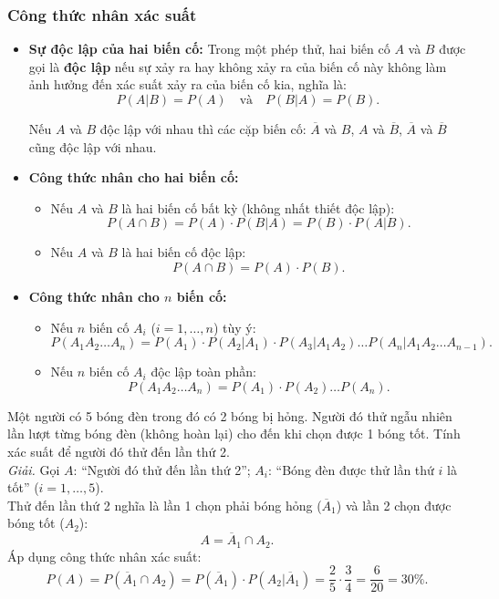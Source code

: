 \subsubsection{Công thức nhân xác suất}
\begin{itemize}[leftmargin=1.5em]
    \item \textbf{Sự độc lập của hai biến cố:}
    Trong một phép thử, hai biến cố $A$ và $B$ được gọi là \textbf{độc lập} nếu sự xảy ra hay không xảy ra của biến cố này không làm ảnh hưởng đến xác suất xảy ra của biến cố kia, nghĩa là:
    \[
    P(A|B) = P(A) \quad \text{và} \quad P(B|A) = P(B).
    \]
    \begin{chuy}
    Nếu $A$ và $B$ độc lập với nhau thì các cặp biến cố: $\overline{A}$ và $B$, $A$ và $\overline{B}$, $\overline{A}$ và $\overline{B}$ cũng độc lập với nhau.
    \end{chuy}

    \item \textbf{Công thức nhân cho hai biến cố:}
    \begin{itemize}
        \item Nếu $A$ và $B$ là hai biến cố bất kỳ (không nhất thiết độc lập):
        \[
        P(A \cap B) = P(A) \cdot P(B|A) = P(B) \cdot P(A|B).
        \]
        \item Nếu $A$ và $B$ là hai biến cố độc lập:
        \[
        P(A \cap B) = P(A) \cdot P(B).
        \]
    \end{itemize}

    \item \textbf{Công thức nhân cho $n$ biến cố:}
    \begin{itemize}
        \item Nếu $n$ biến cố $A_i$ ($i = 1, \dots, n$) tùy ý:
        \[
        P(A_1 A_2 \dots A_n) = P(A_1) \cdot P(A_2 | A_1) \cdot P(A_3 | A_1 A_2) \dots P(A_n | A_1 A_2 \dots A_{n-1}).
        \]
        \item Nếu $n$ biến cố $A_i$ độc lập toàn phần:
        \[
        P(A_1 A_2 \dots A_n) = P(A_1) \cdot P(A_2) \dots P(A_n).
        \]
    \end{itemize}
\end{itemize}

\begin{vidu}
Một người có 5 bóng đèn trong đó có 2 bóng bị hỏng. Người đó thử ngẫu nhiên lần lượt từng bóng đèn (không hoàn lại) cho đến khi chọn được 1 bóng tốt. Tính xác suất để người đó thử đến lần thứ 2.\\
\textit{Giải.} 
Gọi $A$: ``Người đó thử đến lần thứ 2''; $A_i$: ``Bóng đèn được thử lần thứ $i$ là tốt'' ($i = 1, \dots, 5$).\\
Thử đến lần thứ 2 nghĩa là lần 1 chọn phải bóng hỏng ($\overline{A}_1$) và lần 2 chọn được bóng tốt ($A_2$):
\[
A = \overline{A}_1 \cap A_2.
\]
Áp dụng công thức nhân xác suất:
\[
P(A) = P(\overline{A}_1 \cap A_2) = P(\overline{A}_1) \cdot P(A_2 | \overline{A}_1) = \frac{2}{5} \cdot \frac{3}{4} = \frac{6}{20} = 30\%.
\]
\end{vidu}

